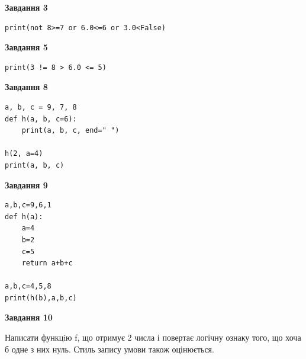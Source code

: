 \documentclass[12pt, ukrainian]{article}
\begin{document}
{\begin {large}
\begin{minipage}[t]{7.5cm}
\end{minipage}
\vline \hspace{6mm}
\begin{minipage}[t]{10.5cm}

\begin{center}
\textbf{Завдання 3}
\end{center}

\begin{verbatim}
print(not 8>=7 or 6.0<=6 or 3.0<False)
\end{verbatim}



\begin{center}
\textbf{Завдання 5}
\end{center}

\begin{verbatim}
print(3 != 8 > 6.0 <= 5)
\end{verbatim}



\begin{center}
\textbf{Завдання 8}
\end{center}

\begin{verbatim}
a, b, c = 9, 7, 8
def h(a, b, c=6):
    print(a, b, c, end=" ")

h(2, a=4)
print(a, b, c)
\end{verbatim}



\begin{center}
\textbf{Завдання 9}
\end{center}

\begin{verbatim}
a,b,c=9,6,1
def h(a):
    a=4
    b=2
    c=5
    return a+b+c

a,b,c=4,5,8
print(h(b),a,b,c)
\end{verbatim}



\begin{center}
\textbf{Завдання 10}
\end{center}

Написати функцiю f, що отримує 2 числа і повертає логічну ознаку того, що хоча б одне з них нуль. Стиль запису умови також оцінюється.\par

\end{minipage}

\end {large}}
\newpage
\end{document}
